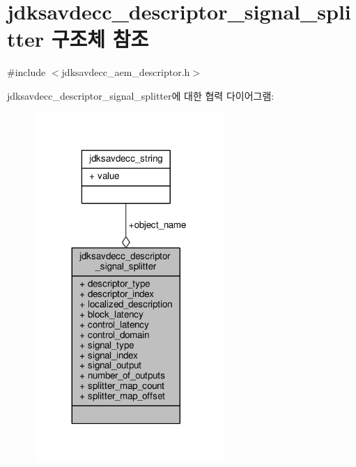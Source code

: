 \hypertarget{structjdksavdecc__descriptor__signal__splitter}{}\section{jdksavdecc\+\_\+descriptor\+\_\+signal\+\_\+splitter 구조체 참조}
\label{structjdksavdecc__descriptor__signal__splitter}


{\ttfamily \#include $<$jdksavdecc\+\_\+aem\+\_\+descriptor.\+h$>$}



jdksavdecc\+\_\+descriptor\+\_\+signal\+\_\+splitter에 대한 협력 다이어그램\+:
\nopagebreak
\begin{figure}[H]
\begin{center}
\leavevmode
\includegraphics[width=203pt]{structjdksavdecc__descriptor__signal__splitter__coll__graph}
\end{center}
\end{figure}

